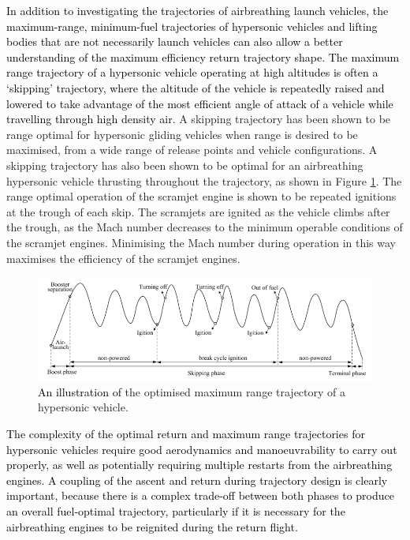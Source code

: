 \textcolor{black}{
	In addition to investigating the trajectories of airbreathing launch vehicles, the maximum-range, minimum-fuel trajectories of hypersonic vehicles and lifting bodies that are not necessarily launch vehicles can also allow a better understanding of the maximum efficiency return trajectory shape. The maximum range trajectory of a hypersonic vehicle operating at high altitudes is often a `skipping' trajectory, where the altitude of the vehicle is repeatedly raised and lowered to take advantage of the most efficient angle of attack of a vehicle while travelling through high density air\cite{Moshman2014,Darby2011,Toso2015,Chai2015,Pesch1980}.} A skipping trajectory has been shown to be range optimal for hypersonic gliding vehicles when range is desired to be maximised, from a wide range of release points and vehicle configurations\cite{Eggers1957,Moshman2014,Pesch1980,Moshman2014,Darby2011,Toso2015,Tetlow1992,Darby2011}. A skipping trajectory has also been shown to be optimal for an airbreathing hypersonic vehicle thrusting throughout the trajectory\cite{Kanda2007,Chai2015}, as shown in Figure \ref{fig:chai-boostskip}. The range optimal operation of the scramjet engine is shown to be repeated ignitions at the trough of each skip\cite{Chai2015}. The scramjets are ignited as the vehicle climbs after the trough, as the Mach number decreases to the minimum operable conditions of the scramjet engines\cite{Chai2015}. Minimising the Mach number during operation in this way maximises the efficiency of the scramjet engines\cite{Chai2015}.
\begin{figure}[ht]
	\centering
	\includegraphics[width=0.9\linewidth]{"figures/2_literature-review/chai-boost skip"}
	\caption{\textcolor{black}{An illustration of }the optimised maximum range trajectory of a hypersonic vehicle\cite{Chai2015}.}
	\label{fig:chai-boostskip}
\end{figure}

\textcolor{black}{
The complexity of the optimal return and maximum range trajectories for hypersonic vehicles require good aerodynamics and manoeuvrability to carry out properly, as well as potentially requiring multiple restarts from the airbreathing engines.
	A coupling of the ascent and return during trajectory design is clearly important, because there is a complex trade-off between both phases to produce an overall fuel-optimal trajectory, particularly if it is necessary for the airbreathing engines to be reignited during the return flight. 
}




